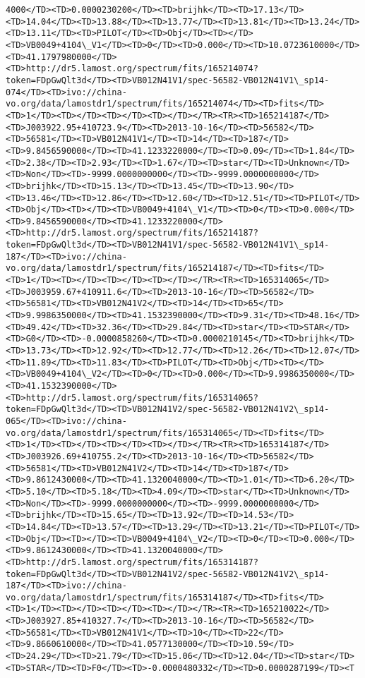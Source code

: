 \documentclass[11pt]{article}
\begin{document}
\begin{Verbatim}[commandchars=\\\{\}]
4000</TD><TD>0.0000230200</TD><TD>brijhk</TD><TD>17.13</TD><TD>14.04</TD><TD>13.88</TD><TD>13.77</TD><TD>13.81</TD><TD>13.24</TD><TD>13.11</TD><TD>PILOT</TD><TD>Obj</TD><TD></TD><TD>VB0049+4104\_V1</TD><TD>0</TD><TD>0.000</TD><TD>10.0723610000</TD><TD>41.1797980000</TD><TD>http://dr5.lamost.org/spectrum/fits/165214074?token=FDpGwQlt3d</TD><TD>VB012N41V1/spec-56582-VB012N41V1\_sp14-074</TD><TD>ivo://china-vo.org/data/lamostdr1/spectrum/fits/165214074</TD><TD>fits</TD><TD>1</TD><TD></TD><TD></TD><TD></TD></TR><TR><TD>165214187</TD><TD>J003922.95+410723.9</TD><TD>2013-10-16</TD><TD>56582</TD><TD>56581</TD><TD>VB012N41V1</TD><TD>14</TD><TD>187</TD><TD>9.8456590000</TD><TD>41.1233220000</TD><TD>0.09</TD><TD>1.84</TD><TD>2.38</TD><TD>2.93</TD><TD>1.67</TD><TD>star</TD><TD>Unknown</TD><TD>Non</TD><TD>-9999.0000000000</TD><TD>-9999.0000000000</TD><TD>brijhk</TD><TD>15.13</TD><TD>13.45</TD><TD>13.90</TD><TD>13.46</TD><TD>12.86</TD><TD>12.60</TD><TD>12.51</TD><TD>PILOT</TD><TD>Obj</TD><TD></TD><TD>VB0049+4104\_V1</TD><TD>0</TD><TD>0.000</TD><TD>9.8456590000</TD><TD>41.1233220000</TD><TD>http://dr5.lamost.org/spectrum/fits/165214187?token=FDpGwQlt3d</TD><TD>VB012N41V1/spec-56582-VB012N41V1\_sp14-187</TD><TD>ivo://china-vo.org/data/lamostdr1/spectrum/fits/165214187</TD><TD>fits</TD><TD>1</TD><TD></TD><TD></TD><TD></TD></TR><TR><TD>165314065</TD><TD>J003959.67+410911.6</TD><TD>2013-10-16</TD><TD>56582</TD><TD>56581</TD><TD>VB012N41V2</TD><TD>14</TD><TD>65</TD><TD>9.9986350000</TD><TD>41.1532390000</TD><TD>9.31</TD><TD>48.16</TD><TD>49.42</TD><TD>32.36</TD><TD>29.84</TD><TD>star</TD><TD>STAR</TD><TD>G0</TD><TD>-0.0000858260</TD><TD>0.0000210145</TD><TD>brijhk</TD><TD>13.73</TD><TD>12.92</TD><TD>12.77</TD><TD>12.26</TD><TD>12.07</TD><TD>11.89</TD><TD>11.83</TD><TD>PILOT</TD><TD>Obj</TD><TD></TD><TD>VB0049+4104\_V2</TD><TD>0</TD><TD>0.000</TD><TD>9.9986350000</TD><TD>41.1532390000</TD><TD>http://dr5.lamost.org/spectrum/fits/165314065?token=FDpGwQlt3d</TD><TD>VB012N41V2/spec-56582-VB012N41V2\_sp14-065</TD><TD>ivo://china-vo.org/data/lamostdr1/spectrum/fits/165314065</TD><TD>fits</TD><TD>1</TD><TD></TD><TD></TD><TD></TD></TR><TR><TD>165314187</TD><TD>J003926.69+410755.2</TD><TD>2013-10-16</TD><TD>56582</TD><TD>56581</TD><TD>VB012N41V2</TD><TD>14</TD><TD>187</TD><TD>9.8612430000</TD><TD>41.1320040000</TD><TD>1.01</TD><TD>6.20</TD><TD>5.10</TD><TD>5.18</TD><TD>4.09</TD><TD>star</TD><TD>Unknown</TD><TD>Non</TD><TD>-9999.0000000000</TD><TD>-9999.0000000000</TD><TD>brijhk</TD><TD>15.65</TD><TD>13.92</TD><TD>14.53</TD><TD>14.84</TD><TD>13.57</TD><TD>13.29</TD><TD>13.21</TD><TD>PILOT</TD><TD>Obj</TD><TD></TD><TD>VB0049+4104\_V2</TD><TD>0</TD><TD>0.000</TD><TD>9.8612430000</TD><TD>41.1320040000</TD><TD>http://dr5.lamost.org/spectrum/fits/165314187?token=FDpGwQlt3d</TD><TD>VB012N41V2/spec-56582-VB012N41V2\_sp14-187</TD><TD>ivo://china-vo.org/data/lamostdr1/spectrum/fits/165314187</TD><TD>fits</TD><TD>1</TD><TD></TD><TD></TD><TD></TD></TR><TR><TD>165210022</TD><TD>J003927.85+410327.7</TD><TD>2013-10-16</TD><TD>56582</TD><TD>56581</TD><TD>VB012N41V1</TD><TD>10</TD><TD>22</TD><TD>9.8660610000</TD><TD>41.0577130000</TD><TD>10.59</TD><TD>24.29</TD><TD>21.79</TD><TD>15.06</TD><TD>12.04</TD><TD>star</TD><TD>STAR</TD><TD>F0</TD><TD>-0.0000480332</TD><TD>0.0000287199</TD><T
\end{Verbatim}
\end{document}
